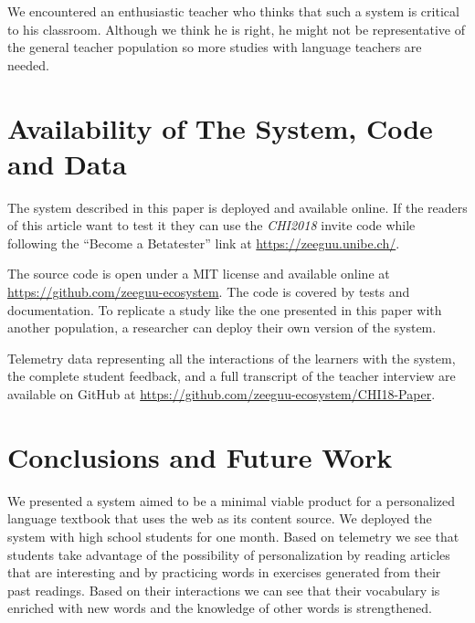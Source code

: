 We encountered an enthusiastic teacher who thinks that such a system is critical to his classroom. Although we think he is right, he might not be representative of the general teacher population so more studies with language teachers are needed.


\section{Availability of The System, Code and Data}

The system described in this paper is deployed and available online. If the readers of this article want to test it they can use the {\em CHI2018} invite code while following the  ``Become a Betatester'' link at \url{https://zeeguu.unibe.ch/}.

The source code is open under a MIT license and available online at \url{https://github.com/zeeguu-ecosystem}. The code is covered by tests and documentation. To replicate a study like the one presented in this paper with another population, a researcher can deploy their own version of the system. 

Telemetry data representing all the interactions of the learners with the system, the complete student feedback, and a full transcript of the teacher interview are available on GitHub at \url{https://github.com/zeeguu-ecosystem/CHI18-Paper}. 





\section{Conclusions and Future Work}
We presented a system aimed to be a minimal viable product for a personalized language textbook that uses the web as its content source. We deployed the system with \studs high school students for one month. 
Based on telemetry we see that students take advantage of the possibility of personalization by 
  reading articles that are interesting and 
  by practicing words in exercises generated from their past readings. 
Based on their interactions we can see that their vocabulary is enriched with new words and the knowledge of other words is strengthened.

